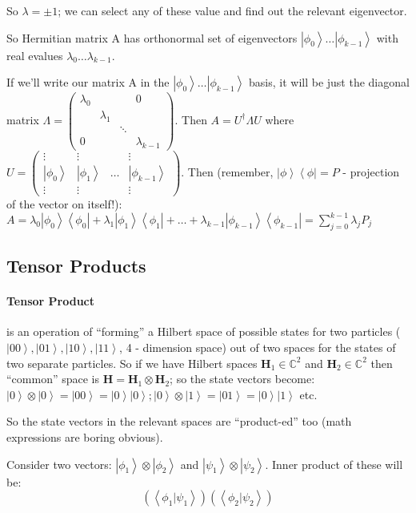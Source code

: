 \documentclass{scrartcl}
\newcommand{\cplx}{\mathbb{C}} %
\newcommand{\ket}[1]{\left| #1 \right>} %
\newcommand{\bra}[1]{\left< #1 \right|} %
\newcommand{\braket}[2]{\left< #1 | #2 \right>} %
\begin{document}
So $\lambda = \pm 1 $; we can select any of these value and find out the
relevant eigenvector.

So Hermitian matrix A has orthonormal set of eigenvectors $\ket{\phi_0} \dots
\ket{\phi_{k-1}}$ with real evalues $\lambda_0 \dots \lambda_{k-1}$.

If we'll write our matrix A in the $\ket{\phi_0} \dots \ket{\phi_{k-1}}$ basis,
it will be just the diagonal matrix $\Lambda = \begin{pmatrix} \lambda_0 &&&0 \\
  & \lambda_1 && \\ & & \ddots & \\ 0 &&& \lambda_{k-1} \end{pmatrix}$. Then $A
= U^\dag \Lambda U$ where $U= \begin{pmatrix} \vdots & \vdots &&\vdots \\
  \ket{\phi_0} & \ket{\phi_1} & \dots & \ket{\phi_{k-1}} \\ \vdots & \vdots
  &&\vdots \end{pmatrix}$. Then (remember, $\ket\phi \bra\phi = P$ - projection
of the vector on itself!): $A = \lambda_0 \ket{\phi_0}\bra{\phi_0} + \lambda_1
\ket{\phi_1}\bra{\phi_1} + \dots + \lambda_{k-1}
\ket{\phi_{k-1}}\bra{\phi_{k-1}} = \sum \limits_{j=0}^{k-1}\lambda_j P_j$

\subsection{Tensor Products}
\label{sec:7-4}

\paragraph{Tensor Product} is an operation of ``forming'' a Hilbert space of
possible states for two particles ($\ket{00}, \ket{01}, \ket{10}, \ket{11}$, 4 -
dimension space) out of two spaces for the states of two separate particles. So
if we have Hilbert spaces $\mathbf{H}_1 \in \cplx^2$ and $\mathbf{H}_2 \in
\cplx^2$ then ``common'' space is $\mathbf{H} = \mathbf{H}_1 \otimes
\mathbf{H}_2$; so the state vectors become: $\ket0 \otimes \ket0 = \ket{00} =
\ket0\ket0; \ket0 \otimes \ket1 = \ket{01} = \ket0\ket1$ etc.

So the state vectors in the relevant spaces are ``product-ed'' too (math
expressions are boring obvious).

Consider two vectors: $\ket{\phi_1} \otimes \ket{\phi_2}$ and $\ket{\psi_1}
\otimes \ket{\psi_2}$. Inner product of these will
be: $$(\braket{\phi_1}{\psi_1}) (\braket{\phi_2}{\psi_2})$$
\end{document}
